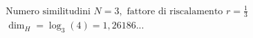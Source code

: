\documentclass[preview]{standalone}
\begin{document}
\begin{align*}
&\text{Numero similitudini } N = 3, \text{ fattore di riscalamento } r = \frac{1}{3} \\ &\dim_H = \log_{3}(4) = 1,26186...
\end{align*}
\end{document}
